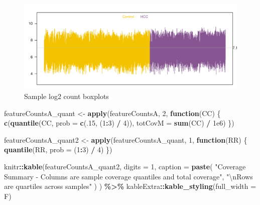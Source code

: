 \documentclass[
]{book}
\newenvironment{Shaded}{\begin{snugshade}}{\end{snugshade}}
\newcommand{\CharTok}[1]{\textcolor[rgb]{0.31,0.60,0.02}{#1}}
\newcommand{\ControlFlowTok}[1]{\textcolor[rgb]{0.13,0.29,0.53}{\textbf{#1}}}
\newcommand{\DataTypeTok}[1]{\textcolor[rgb]{0.13,0.29,0.53}{#1}}
\newcommand{\DecValTok}[1]{\textcolor[rgb]{0.00,0.00,0.81}{#1}}
\newcommand{\FloatTok}[1]{\textcolor[rgb]{0.00,0.00,0.81}{#1}}
\newcommand{\KeywordTok}[1]{\textcolor[rgb]{0.13,0.29,0.53}{\textbf{#1}}}
\newcommand{\NormalTok}[1]{#1}
\newcommand{\OperatorTok}[1]{\textcolor[rgb]{0.81,0.36,0.00}{\textbf{#1}}}
\newcommand{\StringTok}[1]{\textcolor[rgb]{0.31,0.60,0.02}{#1}}
\begin{document}
\begin{figure}
\centering
\includegraphics{Static/figures/lcpmBxp-1.pdf}
\caption{\label{fig:lcpmBxp}Sample log2 count boxplots}
\end{figure}

\begin{Shaded}
\begin{Highlighting}[]
\NormalTok{featureCountsA\_quant <{-}}\StringTok{ }\KeywordTok{apply}\NormalTok{(featureCountsA, }\DecValTok{2}\NormalTok{, }\ControlFlowTok{function}\NormalTok{(CC) \{}
  \KeywordTok{c}\NormalTok{(}\KeywordTok{quantile}\NormalTok{(CC, }\DataTypeTok{prob =} \KeywordTok{c}\NormalTok{(.}\DecValTok{15}\NormalTok{, (}\DecValTok{1}\OperatorTok{:}\DecValTok{3}\NormalTok{) }\OperatorTok{/}\StringTok{ }\DecValTok{4}\NormalTok{)), }\DataTypeTok{totCovM =} \KeywordTok{sum}\NormalTok{(CC) }\OperatorTok{/}\StringTok{ }\FloatTok{1e6}\NormalTok{)}
\NormalTok{\})}

\NormalTok{featureCountsA\_quant2 <{-}}\StringTok{ }\KeywordTok{apply}\NormalTok{(featureCountsA\_quant, }\DecValTok{1}\NormalTok{, }\ControlFlowTok{function}\NormalTok{(RR) \{}
  \KeywordTok{quantile}\NormalTok{(RR, }\DataTypeTok{prob =}\NormalTok{ (}\DecValTok{1}\OperatorTok{:}\DecValTok{3}\NormalTok{) }\OperatorTok{/}\StringTok{ }\DecValTok{4}\NormalTok{)}
\NormalTok{\})}

\NormalTok{knitr}\OperatorTok{::}\KeywordTok{kable}\NormalTok{(featureCountsA\_quant2,}
  \DataTypeTok{digits =} \DecValTok{1}\NormalTok{,}
  \DataTypeTok{caption =} \KeywordTok{paste}\NormalTok{(}
    \StringTok{"Coverage Summary {-} Columns are sample coverage quantiles and total coverage"}\NormalTok{,}
    \StringTok{"}\CharTok{\textbackslash{}n}\StringTok{Rows are quartiles across samples"}
\NormalTok{  )}
\NormalTok{) }\OperatorTok{\%>\%}\StringTok{ }\NormalTok{kableExtra}\OperatorTok{::}\KeywordTok{kable\_styling}\NormalTok{(}\DataTypeTok{full\_width =}\NormalTok{ F)}
\end{Highlighting}
\end{Shaded}
\end{document}
